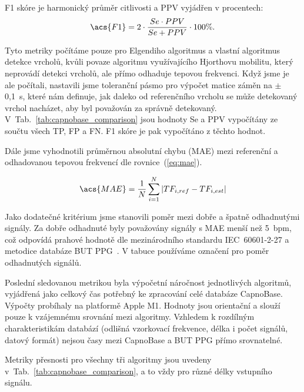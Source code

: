 \acs{F1} skóre je harmonický průměr citlivosti a \acs{PPV} vyjádřen v procentech:
\begin{equation}
	\label{eq:f1}
	\acs{F1} = 2 \cdot \frac{Se \cdot PPV}{Se + PPV} \cdot 100\%.
\end{equation}

Tyto metriky počítáme pouze pro Elgendiho algoritmus a vlastní algoritmus detekce vrcholů, kvůli povaze algoritmu využívajícího Hjorthovu mobilitu, který neprovádí detekci vrcholů, ale přímo odhaduje tepovou frekvenci.
Když jsme je ale počítali, nastavili jsme toleranční pásmo pro výpočet matice záměn na $\pm$0,1~\acs{s}, které nám definuje, jak daleko od referenčního vrcholu se může detekovaný vrchol nacházet, aby byl považován za správně detekovaný.
V~Tab.~\ref{tab:capnobase_comparison} jsou hodnoty \acs{Se} a \acs{PPV} vypočítány ze součtu všech \acs{TP}, \acs{FP} a \acs{FN}.
\acs{F1} skóre je pak vypočítáno z těchto hodnot.

Dále jsme vyhodnotili průměrnou absolutní chybu (\acs{MAE}) mezi referenční a odhadovanou tepovou frekvencí dle rovnice~(\ref{eq:mae}).

\begin{equation}
	\label{eq:mae}
	\acs{MAE} = \frac{1}{N} \sum_{i=1}^{N} |TF_{i,ref} - TF_{i,est}|
\end{equation}

Jako dodatečné kritérium jsme stanovili poměr mezi dobře a špatně odhadnutými signály.
Za dobře odhadnuté byly považovány signály s \acs{MAE} menší než 5~\acs{bpm}, což odpovídá prahové hodnotě dle mezinárodního standardu IEC~60601-2-27 a metodice databáze \acs{BUT PPG}~\cite{BUT_PPG}.
V tabuce používáme označení  pro poměr  odhadnutých signálů.

Poslední sledovanou metrikou byla výpočetní náročnost jednotlivých algoritmů, vyjádřená jako celkový čas potřebný ke zpracování celé databáze CapnoBase.
Výpočty probíhaly na platformě Apple M1.
Hodnoty jsou orientační a slouží pouze k vzájemnému srovnání mezi algoritmy.
Vzhledem k rozdílným charakteristikám databází (odlišná vzorkovací frekvence, délka i počet signálů, datový formát) nejsou časy mezi CapnoBase a \acs{BUT PPG} přímo srovnatelné.

Metriky přesnosti pro všechny tři algoritmy jsou uvedeny v~Tab.~\ref{tab:capnobase_comparison}, a to vždy pro různé délky vstupního signálu.

